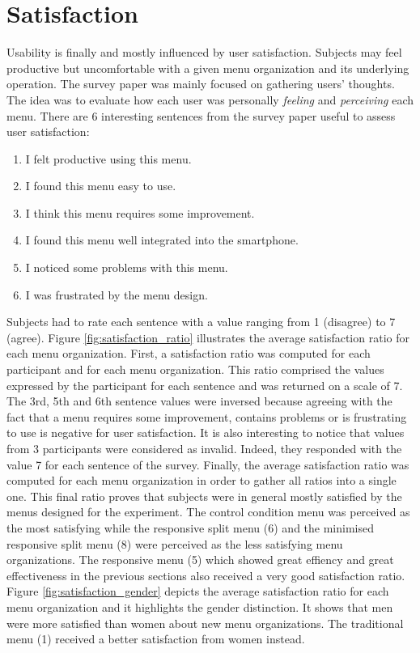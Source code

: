 \begin{figure}[!ht]
    
    \label{fig:selectime_agegender}
\end{figure}

\section{Satisfaction}
Usability is finally and mostly influenced by user satisfaction. Subjects may 
feel productive but uncomfortable with a given menu organization and its 
underlying operation. The survey paper was mainly focused on gathering users' 
thoughts. The idea was to evaluate how each user was personally 
\textit{feeling} 
and \textit{perceiving} each menu. There are 6 interesting sentences from 
the survey paper useful to assess user satisfaction:
\begin{enumerate}
  \item I felt productive using this menu.
  \item I found this menu easy to use.
  \item I think this menu requires some improvement.
  \item I found this menu well integrated into the smartphone.
  \item I noticed some problems with this menu.
  \item I was frustrated by the menu design.
\end{enumerate}
Subjects had to rate each sentence with a value ranging from 1 (disagree) 
to 7 (agree). Figure \ref{fig:satisfaction_ratio} illustrates the average 
satisfaction ratio for each menu organization. First, a satisfaction ratio was 
computed for each participant and for each menu organization. This ratio 
comprised the values expressed by the participant for each sentence and was 
returned on a scale of 7. The 3rd, 5th and 6th sentence values were inversed 
because agreeing with the fact that a menu requires some improvement, contains 
problems or is frustrating to use is negative for user satisfaction. It is also 
interesting to notice that values from 3 participants were considered as 
invalid. Indeed, they responded with the value 7 for each sentence of the 
survey. Finally, the average satisfaction ratio was computed for each menu 
organization in order to gather all ratios into a single one. This final ratio 
proves that subjects were in general mostly satisfied by the menus designed for 
the experiment. The control condition menu was perceived as the most satisfying 
while the responsive split menu (6) and the minimised responsive split menu (8) 
were perceived as the less satisfying menu organizations. The responsive menu 
(5) which showed great effiency and great effectiveness in the previous sections 
also received a very good satisfaction ratio. Figure 
\ref{fig:satisfaction_gender} depicts the average satisfaction ratio for each 
menu organization and it highlights the gender distinction. It shows that men 
were more satisfied than women about new menu organizations. The 
traditional menu (1) received a better satisfaction from women instead.

